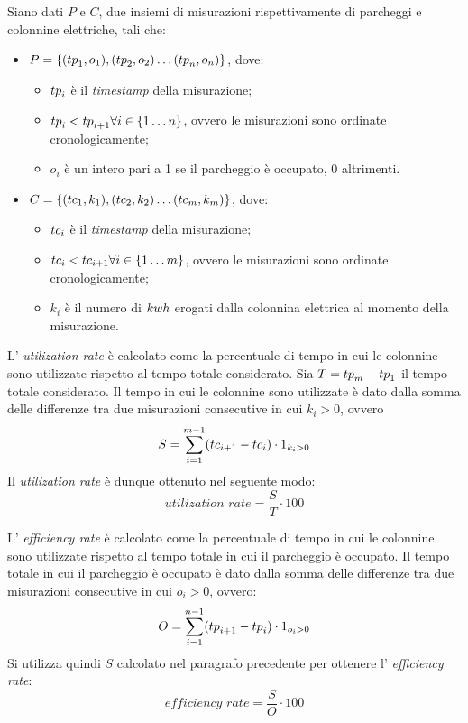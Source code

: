 Siano dati $P$ e $C$, due insiemi di misurazioni rispettivamente di parcheggi e colonnine elettriche, tali che:
\begin{itemize}
	\item $P = \{({tp}_1, o_1), ({tp}_2, o_2)\ldots ({tp}_n, o_n)\}$, dove:
	      \begin{itemize}
		      \item ${tp}_i$ è il \textit{timestamp} della misurazione;
		      \item ${tp}_i < {tp}_{i+1}\forall i\in\{1\ldots n\}$, ovvero le misurazioni sono ordinate cronologicamente;
		      \item $o_i$ è un intero pari a 1 se il parcheggio è occupato, 0 altrimenti.
	      \end{itemize}
	\item $C = \{({tc}_1, k_1), ({tc}_2, k_2)\ldots ({tc}_m, k_m)\}$, dove:
	      \begin{itemize}
		      \item ${tc}_i$ è il \textit{timestamp} della misurazione;
		      \item ${tc}_i < {tc}_{i+1}\forall i\in\{1\ldots m\}$, ovvero le misurazioni sono ordinate cronologicamente;
		      \item $k_i$ è il numero di ${kwh}$ erogati dalla colonnina elettrica al momento della misurazione.
	      \end{itemize}
\end{itemize}

L' \textit{utilization rate} è calcolato come la percentuale di tempo in cui le colonnine sono utilizzate rispetto al tempo totale considerato.
Sia $T = {tp}_m - {tp}_1$ il tempo totale considerato. Il tempo in cui le colonnine sono utilizzate è dato dalla somma delle differenze tra due misurazioni consecutive
in cui $k_i > 0$, ovvero
\[
	S = \sum_{i=1}^{m-1} ({tc}_{i+1} - {tc}_i) \cdot 1_{k_i > 0}
\]
Il \textit{utilization rate} è dunque ottenuto nel seguente modo:
\[
	\textit{utilization rate} = \frac{S}{T} \cdot 100
\]

L' \textit{efficiency rate} è calcolato come la percentuale di tempo in cui le colonnine sono utilizzate rispetto al tempo totale in cui il parcheggio è occupato.
Il tempo totale in cui il parcheggio è occupato è dato dalla somma delle differenze tra due misurazioni consecutive in cui $o_i > 0$, ovvero:
\[
	O = \sum_{i=1}^{n-1} ({tp}_{i+1} - {tp}_i) \cdot 1_{o_i > 0}
\]
Si utilizza quindi $S$ calcolato nel paragrafo precedente per ottenere l' \textit{efficiency rate}:
\[
	\textit{efficiency rate} = \frac{S}{O} \cdot 100
\]


